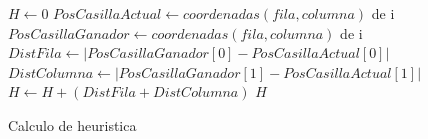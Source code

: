 \documentclass[a4paper]{article}
\theoremstyle{plain}
\theoremstyle{definition}
\begin{document}
        \begin{algorithm}[H]
        \begin{algorithmic}[1]
        
            \State $H \leftarrow 0$
                \State $PosCasillaActual \leftarrow coordenadas (fila,columna)$ de i
                \State $PosCasillaGanador \leftarrow coordenadas (fila,columna)$ de i
                \State
                \State $DistFila \leftarrow |PosCasillaGanador[0] - PosCasillaActual[0]|$
                \State $DistColumna \leftarrow |PosCasillaGanador[1] - PosCasillaActual[1]|$
                \State
                \State $H \leftarrow H + (DistFila + DistColumna)$
            \EndFor
            \State \Return $H$
        \EndProcedure
        
        \end{algorithmic}
        
        \caption{Calculo de heuristica}
        \end{algorithm}
        
\end{document}
